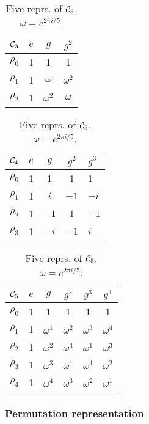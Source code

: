 \begin{table}[hbt!]
	\parbox[s]{.31\linewidth}{
		\centering
		\begin{tabular}{c | c c c}
			$\Cyc_3$ & $e$ & $g$        & $g^2$      \\ \hline
			$\rho_0$          & 1   & 1          & 1          \\
			$\rho_1$          & 1   & $\omega$   & $\omega^2$ \\
			$\rho_2$          & 1   & $\omega^2$ & $\omega$
		\end{tabular}
		\vfill
		\caption{Three reprs. of $\Cyc_3$. $\omega = e^{2 \pi i/3}$.}
		\label{table:Cyc3}
	}
	\hfill
	\parbox[s]{.31\linewidth}{
		\centering
		\begin{tabular}{c | c c cl}
			$\Cyc_4$ & $e$ & $g$  & $g^2$ & $g^3$ \\ \hline
			$\rho_0$           & 1   & 1    & 1     & 1     \\
			$\rho_1$           & 1   & $i$  & $-1$  & $-i$  \\
			$\rho_2$           & 1   & $-1$ & $1$  & $-1$   \\
			$\rho_3$           & 1   & $-i$ & $-1$   & $i$
		\end{tabular}
		\caption{Four reprs. of $\Cyc_4$.}
		\label{tbl:cyc4}
	}
	\hfill
	\parbox[s]{.31\linewidth}{
		\centering
		\begin{tabular}{c | c c c c c}
			$\mathcal{C}_5$ & $e$ & $g$        & $g^2$      & $g^3$      & $g^4$      \\ \hline
			$\rho_0$            & 1   & 1          & 1          & 1          & 1          \\
			$\rho_1$            & 1   & $\omega^1$ & $\omega^2$ & $\omega^3$ & $\omega^4$ \\
			$\rho_2$            & 1   & $\omega^2$ & $\omega^4$ & $\omega^1$ & $\omega^3$ \\
			$\rho_3$            & 1   & $\omega^3$ & $\omega^1$ & $\omega^4$ & $\omega^2$ \\
			$\rho_4$            & 1   & $\omega^4$ & $\omega^3$ & $\omega^2$ & $\omega^1$
		\end{tabular}
		\caption{Five reprs. of $\mathcal{C}_5$. $\omega = e^{2 \pi i/5}$.}
		\label{table:Cyc5}
	}
\end{table}



\subsubsection{Permutation representation}

